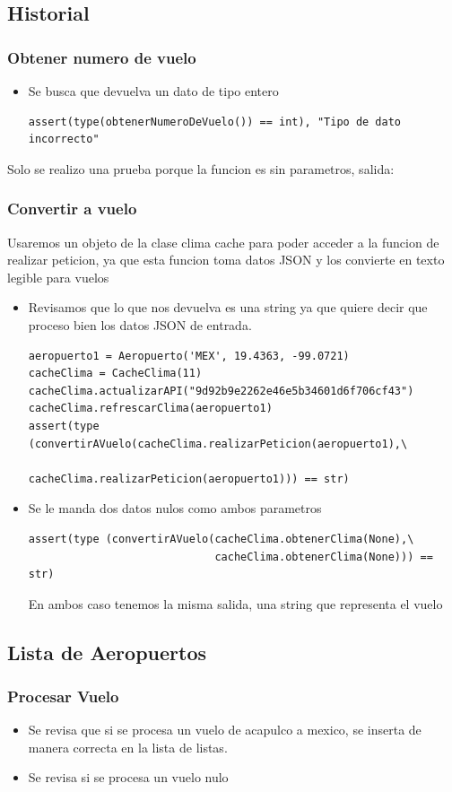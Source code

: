 \documentclass[12pt]{article}
\begin{document}
\subsection{Historial}
\subsubsection{Obtener numero de vuelo}
\begin{itemize}
\item Se busca que devuelva un dato de tipo entero
\begin{verbatim}
assert(type(obtenerNumeroDeVuelo()) == int), "Tipo de dato incorrecto"
\end{verbatim}
\end{itemize}
Solo se realizo una prueba porque la funcion es sin parametros, salida:
\subsubsection{Convertir a vuelo}
Usaremos un objeto de la clase clima cache para poder acceder a la funcion de realizar peticion, ya que esta funcion toma datos JSON y los convierte en texto legible para vuelos
\begin{itemize}
\item Revisamos que lo que nos devuelva es una string ya que quiere decir que proceso bien los datos JSON de entrada.
\begin{verbatim}
aeropuerto1 = Aeropuerto('MEX', 19.4363, -99.0721)
cacheClima = CacheClima(11)
cacheClima.actualizarAPI("9d92b9e2262e46e5b34601d6f706cf43")
cacheClima.refrescarClima(aeropuerto1)
assert(type (convertirAVuelo(cacheClima.realizarPeticion(aeropuerto1),\
                             cacheClima.realizarPeticion(aeropuerto1))) == str)
\end{verbatim}
\item Se le manda dos datos nulos como ambos parametros

\begin{verbatim}
assert(type (convertirAVuelo(cacheClima.obtenerClima(None),\
                             cacheClima.obtenerClima(None))) == str)
\end{verbatim}
  En ambos caso tenemos la misma salida, una string que representa el vuelo
\end{itemize}
\subsection{Lista de Aeropuertos}
\subsubsection{Procesar Vuelo}
\begin{itemize}
\item Se revisa que si se procesa un vuelo de acapulco a mexico, se inserta de manera correcta en la lista de listas.
\item Se revisa si se procesa un vuelo nulo
\end{itemize}
\end{document}
